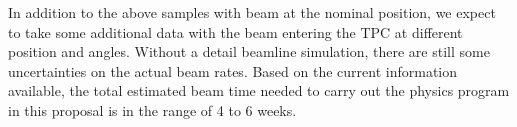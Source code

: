 In addition to the above samples with beam at the nominal position, we expect to take some additional data with the beam entering the TPC at different position and angles. Without a detail beamline simulation, there are still some uncertainties on the actual beam rates.  Based on the current information available, the total estimated beam time needed to carry out the physics program in this proposal is in the range of 4 to 6 weeks.
 



